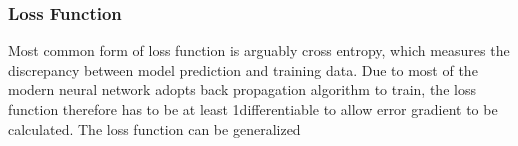 \subsubsection{Loss Function}

Most common form of loss function is arguably cross entropy, which measures the discrepancy between model prediction and training data. Due to most of the modern neural network adopts back propagation algorithm to train, the loss function therefore has to be at least 1\textdegree differentiable to allow error gradient to be calculated. The loss function can be generalized  
